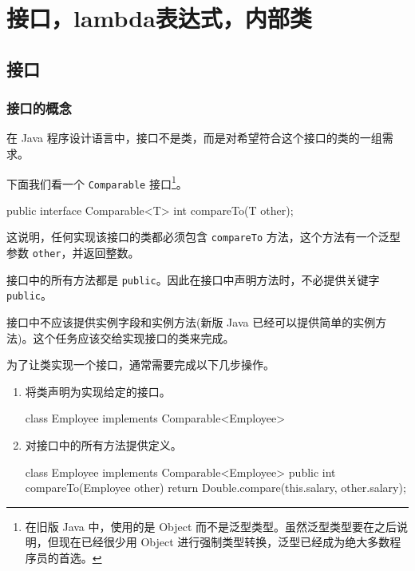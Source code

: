 \section{接口，lambda表达式，内部类}
\subsection{接口}
\subsubsection{接口的概念}

在 Java 程序设计语言中，接口不是类，而是对希望符合这个接口的类的一组需求。

下面我们看一个 \texttt{Comparable} 接口\footnote{在旧版 Java 中，使用的是 Object 而不是泛型类型。虽然泛型类型要在之后说明，但现在已经很少用 Object 进行强制类型转换，泛型已经成为绝大多数程序员的首选。}。
\begin{Java}
public interface Comparable<T> {
    int compareTo(T other);
}
\end{Java}
这说明，任何实现该接口的类都必须包含 \texttt{compareTo} 方法，这个方法有一个泛型参数 \texttt{other}，并返回整数。

接口中的所有方法都是 \texttt{public}。因此在接口中声明方法时，不必提供关键字 \texttt{public}。

接口中不应该提供实例字段和实例方法(新版 Java 已经可以提供简单的实例方法)。这个任务应该交给实现接口的类来完成。

为了让类实现一个接口，通常需要完成以下几步操作。
\begin{enumerate}
    \item 将类声明为实现给定的接口。
\begin{Java}
class Employee implements Comparable<Employee>
\end{Java}
    \item 对接口中的所有方法提供定义。
\begin{Java}
class Employee implements Comparable<Employee> {
    public int compareTo(Employee other) {
        return Double.compare(this.salary, other.salary);
    }
}
\end{Java}
\end{enumerate}


